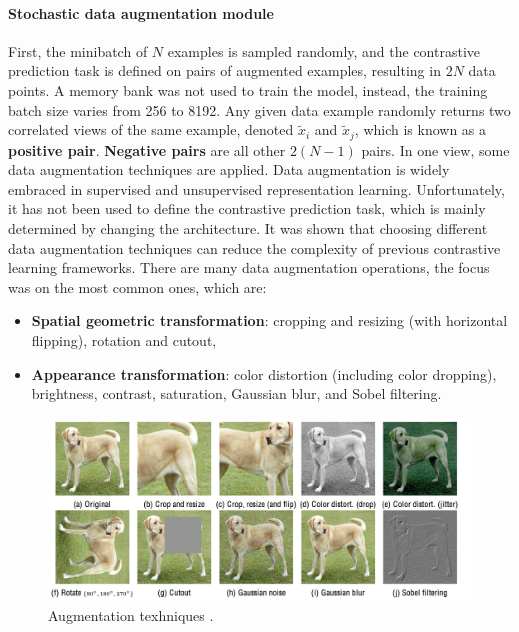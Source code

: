 \documentclass[
]{krantz}
\providecommand{\tightlist}{%
  \setlength{\itemsep}{0pt}\setlength{\parskip}{0pt}}
\begin{document}
\hypertarget{stochastic-data-augmentation-module}{%
\paragraph{Stochastic data augmentation module}\label{stochastic-data-augmentation-module}}

First, the minibatch of \(N\) examples is sampled randomly, and the contrastive prediction task is defined on pairs of augmented examples, resulting in \(2N\) data points. A memory bank was not used to train the model, instead, the training batch size varies from 256 to 8192. Any given data example randomly returns two correlated views of the same example, denoted \(\tilde{x}_{i}\) and \(\tilde{x}_{j}\), which is known as a \textbf{positive pair}. \textbf{Negative pairs} are all other \(2(N-1)\) pairs. In one view, some data augmentation techniques are applied. Data augmentation is widely embraced in supervised and unsupervised representation learning. Unfortunately, it has not been used to define the contrastive prediction task, which is mainly determined by changing the architecture. It was shown that choosing different data augmentation techniques can reduce the complexity of previous contrastive learning frameworks. There are many data augmentation operations, the focus was on the most common ones, which are:

\begin{itemize}
\tightlist
\item
  \textbf{Spatial geometric transformation}: cropping and resizing (with horizontal flipping), rotation and cutout,
\item
  \textbf{Appearance transformation}: color distortion (including color dropping), brightness, contrast, saturation, Gaussian blur, and Sobel filtering.
\end{itemize}

\begin{figure}

{\centering \includegraphics[width=0.8\linewidth]{./figures/01-chapter1/augmentation} 

}

\caption{Augmentation texhniques \citep{SimCLR}.}\label{fig:ch01-figure05}
\end{figure}
\end{document}
